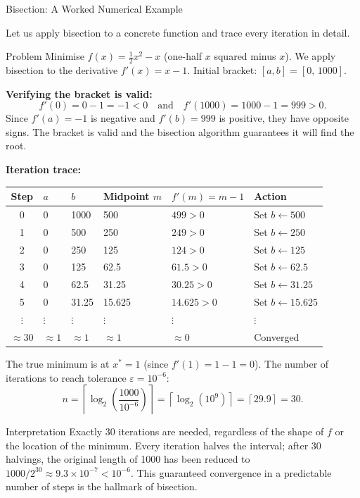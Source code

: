 \documentclass[aspectratio=169,10pt]{beamer}
\begin{document}
\begin{frame}[allowframebreaks]{Bisection: A Worked Numerical Example}

  Let us apply bisection to a concrete function and trace every iteration
  in detail.

  \begin{block}{Problem}
    Minimise $f(x) = \tfrac{1}{2}x^2 - x$ (one-half $x$ squared minus $x$).
    We apply bisection to the derivative $f'(x) = x - 1$.  Initial bracket:
    $[a, b] = [0,\, 1000]$.
  \end{block}

  \textbf{Verifying the bracket is valid:}
  \[
    f'(0) = 0 - 1 = -1 < 0
    \quad \text{and} \quad
    f'(1000) = 1000 - 1 = 999 > 0.
  \]
  Since $f'(a) = -1$ is negative and $f'(b) = 999$ is positive, they have
  opposite signs.  The bracket is valid and the bisection algorithm guarantees
  it will find the root.

  \textbf{Iteration trace:}

  \begin{center}
    \begin{tabular}{@{}clllll@{}}
      \toprule
      Step & $a$ & $b$ & Midpoint $m$ & $f'(m) = m - 1$ & Action \\
      \midrule
      0 & 0 & 1000 & 500 & $499 > 0$ & Set $b \leftarrow 500$ \\
      1 & 0 & 500  & 250 & $249 > 0$ & Set $b \leftarrow 250$ \\
      2 & 0 & 250  & 125 & $124 > 0$ & Set $b \leftarrow 125$ \\
      3 & 0 & 125  & 62.5 & $61.5 > 0$ & Set $b \leftarrow 62.5$ \\
      4 & 0 & 62.5 & 31.25 & $30.25 > 0$ & Set $b \leftarrow 31.25$ \\
      5 & 0 & 31.25 & 15.625 & $14.625 > 0$ & Set $b \leftarrow 15.625$ \\
      $\vdots$ & $\vdots$ & $\vdots$ & $\vdots$ & $\vdots$ & $\vdots$ \\
      $\approx 30$ & $\approx 1$ & $\approx 1$ & $\approx 1$ & $\approx 0$ & Converged \\
      \bottomrule
    \end{tabular}
  \end{center}

  The true minimum is at $x^* = 1$ (since $f'(1) = 1 - 1 = 0$).
  The number of iterations to reach tolerance $\varepsilon = 10^{-6}$:
  \[
    n = \left\lceil \log_2\!\left(\frac{1000}{10^{-6}}\right) \right\rceil
      = \left\lceil \log_2(10^9) \right\rceil
      = \left\lceil 29.9 \right\rceil
      = 30.
  \]

  \begin{exampleblock}{Interpretation}
    Exactly 30 iterations are needed, regardless of the shape of $f$ or
    the location of the minimum.  Every iteration halves the interval;
    after 30 halvings, the original length of 1000 has been reduced to
    $1000 / 2^{30} \approx 9.3 \times 10^{-7} < 10^{-6}$.  This guaranteed
    convergence in a predictable number of steps is the hallmark of bisection.
  \end{exampleblock}

\end{frame}
\end{document}
